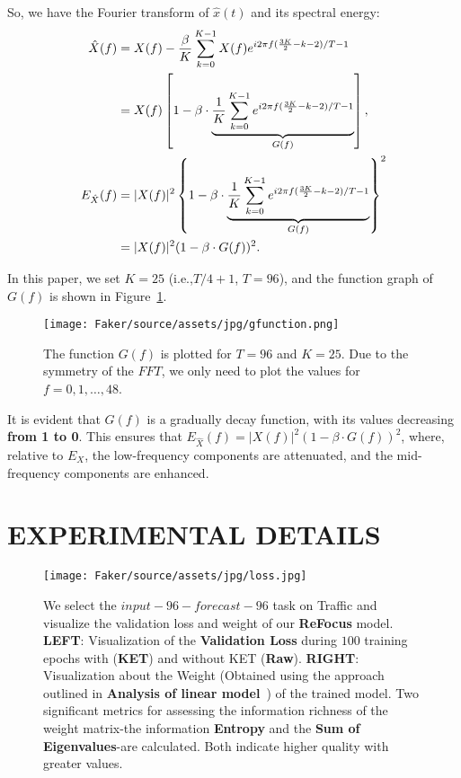 So, we have the Fourier transform of $\hat{x}(t)$ and its spectral energy:
\begin{align}
\hat{X}(f) &=X(f)-\frac{\beta}{K} \sum_{k=0}^{K-1}X(f)e^{i 2 \pi f (\frac{3K}{2} - k-2) / {T-1}}\notag\\
&=X(f) \left[ 1 - \beta \cdot \underbrace{\frac{1}{K} \sum_{k=0}^{K-1} e^{i 2 \pi f (\frac{3K}{2} -k-2) / {T-1}}}_{G(f)} \right],\notag\\
E_{\hat{X}}(f)& =|X(f)|^2 \left\{1 - \beta \cdot \underbrace{\frac{1}{K} \sum_{k=0}^{K-1} e^{i 2 \pi f (\frac{3K}{2}-k -2) / {T-1}}}_{G(f)}\right\}^2\notag\\
&=|X(f)|^2 (1 - \beta \cdot G(f))^2.
\end{align}

In this paper, we set $ K = 25 $ (i.e.,$ T/4 + 1 $, $T=96$), and the function graph of $G(f)$ is shown in Figure~\ref{fig:gfunction}.
\begin{figure}[h]
  \centering
  \texttt{[image: Faker/source/assets/jpg/gfunction.png]}
  \caption{\small{The function $ G(f)$ is plotted for $ T = 96 $ and $ K = 25 $. Due to the symmetry of the $FFT$, we only need to plot the values for $ f = 0, 1, \dots, 48 $.}}
  \label{fig:gfunction}
\end{figure}

It is evident that $ G(f) $ is a gradually decay function, with its values decreasing \textbf{from 1 to 0}. This ensures that $ E_{\hat{X}}(f) = |X(f)|^2 (1 - \beta \cdot G(f))^2 $, where, relative to $ E_X $, the low-frequency components are attenuated, and the mid-frequency components are enhanced.


\section{EXPERIMENTAL DETAILS}
\begin{figure*}[ht]
  \centering
  \texttt{[image: Faker/source/assets/jpg/loss.jpg]}
  \caption{\small{We select the $input-96-forecast-96$ task on Traffic and visualize the validation loss and weight of our \textbf{ReFocus} model. \textbf{LEFT}: Visualization of the \textbf{Validation Loss} during $100$ training epochs with (\textbf{KET}) and without KET (\textbf{Raw}). \textbf{RIGHT}: Visualization about the Weight (Obtained using the approach outlined in \textbf{Analysis of linear model}~\citep{toner2024alinear}) of the trained model. Two significant metrics for assessing the information richness of the weight matrix-the information \textbf{Entropy} and the \textbf{Sum of Eigenvalues}-are calculated. Both indicate higher quality with greater values.}}
  \label{fig:loss_wei}
\end{figure*}
\label{app:exp}
